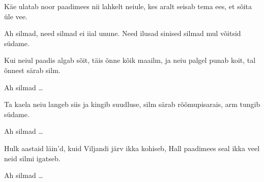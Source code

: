 K\"ae ulatab noor paadimees nii lahkelt neiule,
kes aralt seisab tema ees, et s\~oita \"ule vee.

Ah silmad, need silmad ei iial unune.
Need ilusad sinised silmad mul v\~oitsid s\"udame.

Kui neiul paadis algab s\~oit, t\"ais \~onne k\~oik maailm,
ja neiu palgel punab koit, tal \~onnest s\"arab silm.

Ah silmad \ldots

Ta kaela neiu langeb siis ja kingib suudluse,
silm s\"arab r\~o\~omupisarais, arm tungib s\"udame.

Ah silmad \ldots

Hulk aastaid l\"ain'd, kuid Viljandi j\"arv ikka kohiseb,
Hall paadimees seal ikka veel neid silmi igatseb.

Ah silmad \ldots